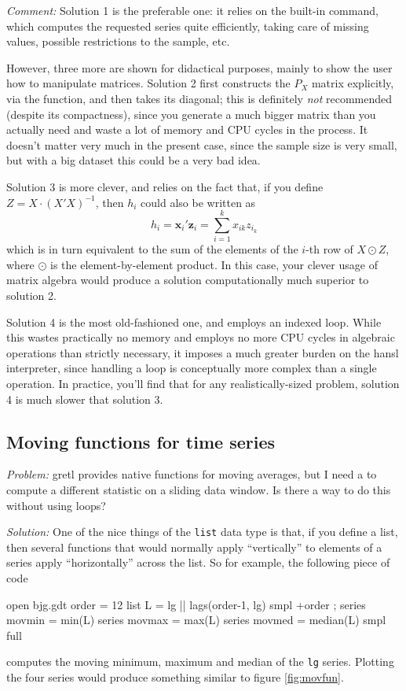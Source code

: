 \emph{Comment:} Solution 1 is the preferable one: it relies on the
built-in  command, which computes the requested series
quite efficiently, taking care of missing values, possible
restrictions to the sample, etc.

However, three more are shown for didactical purposes, mainly to show
the user how to manipulate matrices. Solution 2 first constructs the
$P_X$ matrix explicitly, via the  function, and then takes
its diagonal; this is definitely \emph{not} recommended (despite its
compactness), since you generate a much bigger matrix than you
actually need and waste a lot of memory and CPU cycles in the
process. It doesn't matter very much in the present case, since the
sample size is very small, but with a big dataset this could be a very
bad idea.

Solution 3 is more clever, and relies on the fact that, if you
define $Z = X\cdot(X'X)^{-1}$, then $h_i$ could also
be written as
\[
 h_i = \mathbf{x}_i' \mathbf{z}_i = \sum_{i=1}^k x_{ik} z_{i_k}
\]
which is in turn equivalent to the sum of the elements of the $i$-th
row of $X \odot Z$, where $\odot$ is the element-by-element
product. In this case, your clever usage of matrix algebra would
produce a solution computationally much superior to solution 2.

Solution 4 is the most old-fashioned one, and employs an indexed
loop. While this wastes practically no memory and employs no more CPU
cycles in algebraic operations than strictly necessary, it imposes a
much greater burden on the hansl interpreter, since handling a loop is
conceptually more complex than a single operation. In practice, you'll
find that for any realistically-sized problem, solution 4 is much
slower that solution 3.

\subsection{Moving functions for time series}
\label{sec:movfun}

\emph{Problem:} gretl provides native functions for moving
averages, but I need a to compute a different statistic on a sliding
data window. Is there a way to do this without using loops?

\emph{Solution:} One of the nice things of the \texttt{list} data type
is that, if you define a list, then several functions that would
normally apply ``vertically'' to elements of a series apply
``horizontally'' across the list. So for example, the following piece
of code
\begin{code}
open bjg.gdt
order = 12
list L = lg || lags(order-1, lg)
smpl +order ;
series movmin = min(L)
series movmax = max(L)
series movmed = median(L)
smpl full
\end{code}
computes the moving minimum, maximum and median of the \texttt{lg}
series. Plotting the four series would produce something similar to
figure \ref{fig:movfun}.

